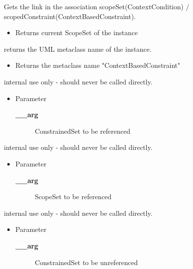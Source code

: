 \begin{desc}Gets the link in the association scopeSet(ContextCondition)
 $/$ scopedConstraint(ContextBasedConstraint).
\begin{itemize}
\item{Returns current ScopeSet of the instance }
\end{itemize}
\end{desc}

\begin{desc}returns the UML metaclass name of the instance.
\begin{itemize}
\item{Returns the metaclass name "ContextBasedConstraint" }
\end{itemize}
\end{desc}

\begin{desc}internal use only - should never be called directly.
\begin{itemize}
\item{Parameter
  \begin{description}
   \item[{\bf \_\_arg}]{ConstrainedSet to be referenced}
  \end{description}}
\end{itemize}
\end{desc}

\begin{desc}internal use only - should never be called directly.
\begin{itemize}
\item{Parameter
  \begin{description}
   \item[{\bf \_\_arg}]{ScopeSet to be referenced}
  \end{description}}
\end{itemize}
\end{desc}

\begin{desc}internal use only - should never be called directly.
\begin{itemize}
\item{Parameter
  \begin{description}
   \item[{\bf \_\_arg}]{ConstrainedSet to be unreferenced}
  \end{description}}
\end{itemize}
\end{desc}

